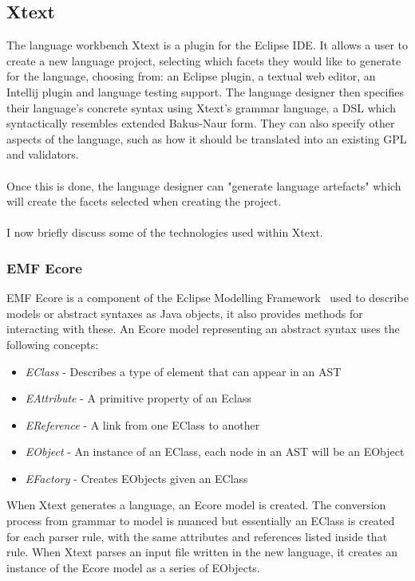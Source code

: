 \documentclass{article}
\begin{document}
\subsection{Xtext}\label{xtext}
The language workbench Xtext is a plugin for the Eclipse IDE. It allows a user to create a new language project, selecting which facets they would like to generate for the language, choosing from: an Eclipse plugin, a textual web editor, an Intellij plugin and language testing support. The language designer then specifies their language's concrete syntax using Xtext's grammar language, a DSL which syntactically resembles extended Bakus-Naur form. They can also specify other aspects of the language, such as how it should be translated into an existing GPL and validators.
\\
\\
Once this is done, the language designer can "generate language artefacts" which will create the facets selected when creating the project. 
\\
\\
I now briefly discuss some of the technologies used within Xtext.
\subsubsection{EMF Ecore}\label{emf}
EMF Ecore is a component of the Eclipse Modelling Framework~\cite{emf} used to describe models or abstract syntaxes as Java objects, it also provides methods for interacting with these. An Ecore model representing an abstract syntax uses the following concepts:
\begin{itemize}
\item \emph{EClass} - Describes a type of element that can appear in an AST
\item \emph{EAttribute} - A primitive property of an Eclass
\item \emph{EReference} - A link from one EClass to another
\item \emph{EObject} - An instance of an EClass, each node in an AST will be an EObject
\item \emph{EFactory} - Creates EObjects given an EClass
\end{itemize}
When Xtext generates a language, an Ecore model is created. The conversion process from grammar to model is nuanced but essentially an EClass is created for each parser rule, with the same attributes and references listed inside that rule. When Xtext parses an input file written in the new language, it creates an instance of the Ecore model as a series of EObjects.
\end{document}
